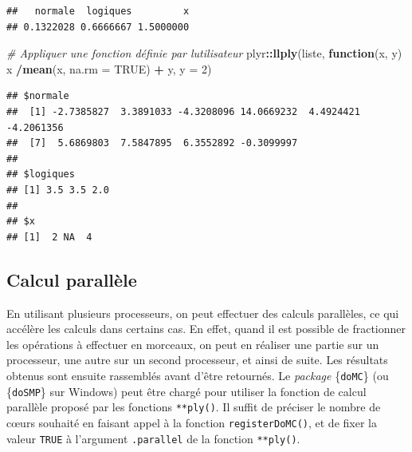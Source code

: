 \documentclass[
  11pt,
]{book}
\newenvironment{Shaded}{\begin{snugshade}}{\end{snugshade}}
\newcommand{\CommentTok}[1]{\textcolor[rgb]{0.56,0.35,0.01}{\textit{#1}}}
\newcommand{\ControlFlowTok}[1]{\textcolor[rgb]{0.13,0.29,0.53}{\textbf{#1}}}
\newcommand{\DataTypeTok}[1]{\textcolor[rgb]{0.13,0.29,0.53}{#1}}
\newcommand{\DecValTok}[1]{\textcolor[rgb]{0.00,0.00,0.81}{#1}}
\newcommand{\KeywordTok}[1]{\textcolor[rgb]{0.13,0.29,0.53}{\textbf{#1}}}
\newcommand{\NormalTok}[1]{#1}
\newcommand{\OperatorTok}[1]{\textcolor[rgb]{0.81,0.36,0.00}{\textbf{#1}}}
\newcommand{\OtherTok}[1]{\textcolor[rgb]{0.56,0.35,0.01}{#1}}
\newcommand{\StringTok}[1]{\textcolor[rgb]{0.31,0.60,0.02}{#1}}
\numberwithin{equation}{section}
\numberwithin{countremarque}{section}
\begin{document}
\begin{lstlisting}
##   normale  logiques         x 
## 0.1322028 0.6666667 1.5000000
\end{lstlisting}

\begin{Shaded}
\begin{Highlighting}[]
\CommentTok{\# Appliquer une fonction définie par l\textquotesingle{}utilisateur}
\NormalTok{plyr}\OperatorTok{::}\KeywordTok{llply}\NormalTok{(liste, }\ControlFlowTok{function}\NormalTok{(x, y) x }\OperatorTok{/}\KeywordTok{mean}\NormalTok{(x, }\DataTypeTok{na.rm =} \OtherTok{TRUE}\NormalTok{) }\OperatorTok{+}\StringTok{ }\NormalTok{y, }\DataTypeTok{y =} \DecValTok{2}\NormalTok{)}
\end{Highlighting}
\end{Shaded}

\begin{lstlisting}
## $normale
##  [1] -2.7385827  3.3891033 -4.3208096 14.0669232  4.4924421 -4.2061356
##  [7]  5.6869803  7.5847895  6.3552892 -0.3099997
## 
## $logiques
## [1] 3.5 3.5 2.0
## 
## $x
## [1]  2 NA  4
\end{lstlisting}

\hypertarget{boucles_vectorisation_plyr_parallel}{%
\subsection{Calcul parallèle}\label{boucles_vectorisation_plyr_parallel}}

En utilisant plusieurs processeurs, on peut effectuer des calculs parallèles, ce qui accélère les calculs dans certains cas. En effet, quand il est possible de fractionner les opérations à effectuer en morceaux, on peut en réaliser une partie sur un processeur, une autre sur un second processeur, et ainsi de suite. Les résultats obtenus sont ensuite rassemblés avant d'être retournés. Le \emph{package} \{\texttt{doMC}\} (ou \{\texttt{doSMP}\} sur Windows) peut être chargé pour utiliser la fonction de calcul parallèle proposé par les fonctions \texttt{**ply()}. Il suffit de préciser le nombre de cœurs souhaité en faisant appel à la fonction \texttt{registerDoMC()}, et de fixer la valeur \texttt{TRUE} à l'argument \texttt{.parallel} de la fonction \texttt{**ply()}.
\end{document}
